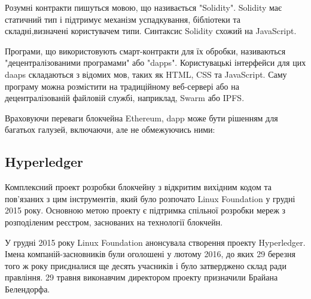 \documentclass{lib/styles/default-style}
\begin{document}

    Розумні контракти пишуться мовою, що називається "Solidity". Solidity має статичний тип і підтримує механізм успадкування,
    бібліотеки та складні,визначені користувачем типи. Синтаксис Solidity схожий на JavaScript.

    Програми, що використовують смарт-контракти для їх обробки, називаються "децентралізованими програмами" або "dapps".
    Користувацькі інтерфейси для цих daaps складаються з відомих мов, таких як HTML, CSS та JavaScript.
    Саму програму можна розмістити на традиційному веб-сервері або на децентралізованій файловій службі, наприклад, Swarm або IPFS.

    Враховуючи переваги блокчейна Ethereum, dapp може бути рішенням для багатьох галузей, включаючи, але не обмежуючись ними:


\subsection{Hyperledger}

    Комплексний проект розробки блокчейну з відкритим вихідним кодом та пов'язаних з цим інструментів,
    який було розпочато Linux Foundation у грудні 2015 року. Основною метою проекту є підтримка спільної
    розробки мереж з розподіленим реєстром, заснованих на технології блокчейн.
    
    У грудні 2015 року Linux Foundation анонсувала створення проекту Hyperledger.
    Імена компаній-засновників були оголошені у лютому 2016, до яких 29 березня того ж року приєдналися ще
    десять учасників і було затверджено склад ради правління. 29 травня виконавчим директором проекту призначили Брайана Белендорфа.
    
\end{document}
